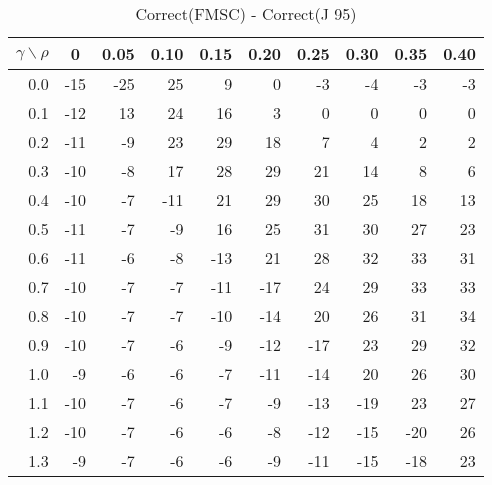 \documentclass[12pt]{article}
\begin{document}
\begin{table}[!tbp]
\caption{Correct(FMSC) - Correct(J 95)}
 \begin{center}
 \begin{tabular}{r|rrrrrrrrr}\hline\hline
\multicolumn{1}{c|}{$\gamma\backslash\rho$}&\multicolumn{1}{c}{0}&\multicolumn{1}{c}{0.05}&\multicolumn{1}{c}{0.10}&\multicolumn{1}{c}{0.15}&\multicolumn{1}{c}{0.20}&\multicolumn{1}{c}{0.25}&\multicolumn{1}{c}{0.30}&\multicolumn{1}{c}{0.35}&\multicolumn{1}{c}{0.40}\tabularnewline
\hline


0.0&-15&-25& 25&  9&  0& -3& -4& -3&-3\tabularnewline
0.1&-12& 13& 24& 16&  3&  0&  0&  0& 0\tabularnewline
0.2&-11& -9& 23& 29& 18&  7&  4&  2& 2\tabularnewline
0.3&-10& -8& 17& 28& 29& 21& 14&  8& 6\tabularnewline
0.4&-10& -7&-11& 21& 29& 30& 25& 18&13\tabularnewline
0.5&-11& -7& -9& 16& 25& 31& 30& 27&23\tabularnewline
0.6&-11& -6& -8&-13& 21& 28& 32& 33&31\tabularnewline
0.7&-10& -7& -7&-11&-17& 24& 29& 33&33\tabularnewline
0.8&-10& -7& -7&-10&-14& 20& 26& 31&34\tabularnewline
0.9&-10& -7& -6& -9&-12&-17& 23& 29&32\tabularnewline
1.0& -9& -6& -6& -7&-11&-14& 20& 26&30\tabularnewline
1.1&-10& -7& -6& -7& -9&-13&-19& 23&27\tabularnewline
1.2&-10& -7& -6& -6& -8&-12&-15&-20&26\tabularnewline
1.3& -9& -7& -6& -6& -9&-11&-15&-18&23\tabularnewline
\hline
\end{tabular}

\end{center}

\end{table}

%
\end{document}
